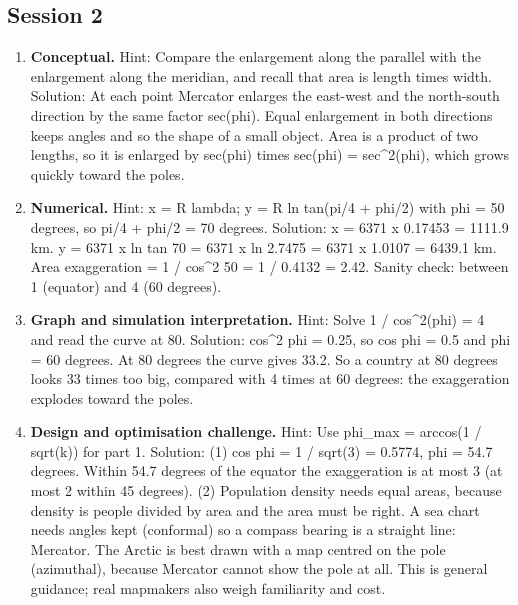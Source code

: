 \documentclass[11pt,a4paper]{article}
\begin{document}
\subsection*{Session 2}
\begin{enumerate}[nosep]
\item \textbf{Conceptual.} Hint: Compare the enlargement along the parallel with the enlargement along the meridian, and recall that area is length times width. Solution: At each point Mercator enlarges the east-west and the north-south direction by the same factor sec(phi). Equal enlargement in both directions keeps angles and so the shape of a small object. Area is a product of two lengths, so it is enlarged by sec(phi) times sec(phi) = sec\textasciicircum{}2(phi), which grows quickly toward the poles.
\item \textbf{Numerical.} Hint: x = R lambda; y = R ln tan(pi/4 + phi/2) with phi = 50 degrees, so pi/4 + phi/2 = 70 degrees. Solution: x = 6371 x 0.17453 = 1111.9 km. y = 6371 x ln tan 70 = 6371 x ln 2.7475 = 6371 x 1.0107 = 6439.1 km. Area exaggeration = 1 / cos\textasciicircum{}2 50 = 1 / 0.4132 = 2.42. Sanity check: between 1 (equator) and 4 (60 degrees).
\item \textbf{Graph and simulation interpretation.} Hint: Solve 1 / cos\textasciicircum{}2(phi) = 4 and read the curve at 80. Solution: cos\textasciicircum{}2 phi = 0.25, so cos phi = 0.5 and phi = 60 degrees. At 80 degrees the curve gives 33.2. So a country at 80 degrees looks 33 times too big, compared with 4 times at 60 degrees: the exaggeration explodes toward the poles.
\item \textbf{Design and optimisation challenge.} Hint: Use phi\_max = arccos(1 / sqrt(k)) for part 1. Solution: (1) cos phi = 1 / sqrt(3) = 0.5774, phi = 54.7 degrees. Within 54.7 degrees of the equator the exaggeration is at most 3 (at most 2 within 45 degrees). (2) Population density needs equal areas, because density is people divided by area and the area must be right. A sea chart needs angles kept (conformal) so a compass bearing is a straight line: Mercator. The Arctic is best drawn with a map centred on the pole (azimuthal), because Mercator cannot show the pole at all. This is general guidance; real mapmakers also weigh familiarity and cost.
\end{enumerate}
\end{document}
